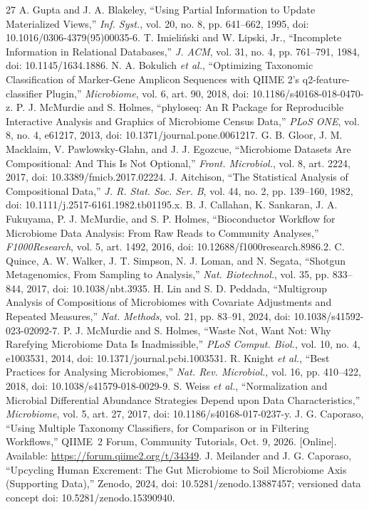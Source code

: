 \documentclass[conference]{IEEEtran}
\begin{document}
\begin{thebibliography}{27}
 A. Gupta and J. A. Blakeley, ``Using Partial Information to Update Materialized Views,'' \emph{Inf. Syst.}, vol. 20, no. 8, pp. 641--662, 1995, doi: 10.1016/0306-4379(95)00035-6.
 T. Imieli\'nski and W. Lipski, Jr., ``Incomplete Information in Relational Databases,'' \emph{J. ACM}, vol. 31, no. 4, pp. 761--791, 1984, doi: 10.1145/1634.1886.
 N. A. Bokulich \emph{et al.}, ``Optimizing Taxonomic Classification of Marker-Gene Amplicon Sequences with QIIME 2's q2-feature-classifier Plugin,'' \emph{Microbiome}, vol. 6, art. 90, 2018, doi: 10.1186/s40168-018-0470-z.
 P. J. McMurdie and S. Holmes, ``phyloseq: An R Package for Reproducible Interactive Analysis and Graphics of Microbiome Census Data,'' \emph{PLoS ONE}, vol. 8, no. 4, e61217, 2013, doi: 10.1371/journal.pone.0061217.
 G. B. Gloor, J. M. Macklaim, V. Pawlowsky-Glahn, and J. J. Egozcue, ``Microbiome Datasets Are Compositional: And This Is Not Optional,'' \emph{Front. Microbiol.}, vol. 8, art. 2224, 2017, doi: 10.3389/fmicb.2017.02224.
 J. Aitchison, ``The Statistical Analysis of Compositional Data,'' \emph{J. R. Stat. Soc. Ser. B}, vol. 44, no. 2, pp. 139--160, 1982, doi: 10.1111/j.2517-6161.1982.tb01195.x.
 B. J. Callahan, K. Sankaran, J. A. Fukuyama, P. J. McMurdie, and S. P. Holmes, ``Bioconductor Workflow for Microbiome Data Analysis: From Raw Reads to Community Analyses,'' \emph{F1000Research}, vol. 5, art. 1492, 2016, doi: 10.12688/f1000research.8986.2.
 C. Quince, A. W. Walker, J. T. Simpson, N. J. Loman, and N. Segata, ``Shotgun Metagenomics, From Sampling to Analysis,'' \emph{Nat. Biotechnol.}, vol. 35, pp. 833--844, 2017, doi: 10.1038/nbt.3935.
 H. Lin and S. D. Peddada, ``Multigroup Analysis of Compositions of Microbiomes with Covariate Adjustments and Repeated Measures,'' \emph{Nat. Methods}, vol. 21, pp. 83--91, 2024, doi: 10.1038/s41592-023-02092-7.
 P. J. McMurdie and S. Holmes, ``Waste Not, Want Not: Why Rarefying Microbiome Data Is Inadmissible,'' \emph{PLoS Comput. Biol.}, vol. 10, no. 4, e1003531, 2014, doi: 10.1371/journal.pcbi.1003531.
 R. Knight \emph{et al.}, ``Best Practices for Analysing Microbiomes,'' \emph{Nat. Rev. Microbiol.}, vol. 16, pp. 410--422, 2018, doi: 10.1038/s41579-018-0029-9.
 S. Weiss \emph{et al.}, ``Normalization and Microbial Differential Abundance Strategies Depend upon Data Characteristics,'' \emph{Microbiome}, vol. 5, art. 27, 2017, doi: 10.1186/s40168-017-0237-y.
 J. G. Caporaso, ``Using Multiple Taxonomy Classifiers, for Comparison or in Filtering Workflows,'' QIIME~2 Forum, Community Tutorials, Oct. 9, 2026. [Online]. Available: \url{https://forum.qiime2.org/t/34349}.
 J. Meilander and J. G. Caporaso, ``Upcycling Human Excrement: The Gut Microbiome to Soil Microbiome Axis (Supporting Data),'' Zenodo, 2024, doi: 10.5281/zenodo.13887457; versioned data concept doi: 10.5281/zenodo.15390940.
\end{thebibliography}
\end{document}

